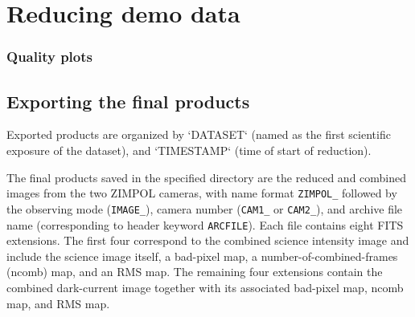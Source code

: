 
\section{Reducing demo data}
\label{sec:reducing_demo_data}



 
\subsubsection{Quality plots}


\subsection{Exporting the final products}
\label{sec:export_final_products}




 \clearpage
 
Exported products are organized by `DATASET` (named as the first scientific exposure of the dataset), and `TIMESTAMP` (time of start of reduction). 

The final products saved in the specified directory are the reduced and combined images from the two ZIMPOL cameras,
with name format \texttt{ZIMPOL\_} followed by the observing mode (\texttt{IMAGE\_}), camera number (\texttt{CAM1\_} or \texttt{CAM2\_}),
and archive file name (corresponding to header keyword \texttt{ARCFILE}).
Each file contains eight FITS extensions. The first four correspond to the combined science intensity image and include the science image itself, a bad-pixel map, a number-of-combined-frames (ncomb) map, and an RMS map. The remaining four extensions contain the combined dark-current image together with its associated bad-pixel map, ncomb map, and RMS map.